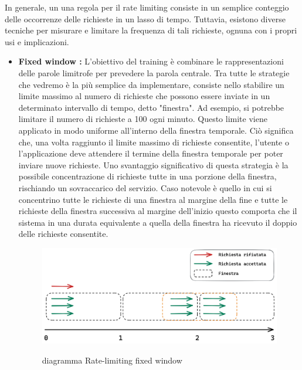In generale, un una regola per il rate limiting consiste in un semplice conteggio delle occorrenze delle richieste in un
lasso di tempo. Tuttavia, esistono diverse tecniche per misurare e limitare la frequenza di tali richieste, ognuna con i
propri usi e implicazioni.
\begin{itemize}
    \item \textbf{Fixed window :} L'obiettivo del training è combinare le rappresentazioni delle parole limitrofe per
     prevedere la parola centrale. Tra tutte le strategie che vedremo è la più semplice da implementare, consiste nello
     stabilire un limite massimo al numero di richieste che possono essere inviate in un determinato intervallo di
     tempo, detto "finestra". Ad esempio, si potrebbe limitare il numero di richieste a 100 ogni minuto. Questo limite
     viene applicato in modo uniforme all'interno della finestra temporale. Ciò significa che, una volta raggiunto il
     limite massimo di richieste consentite, l'utente o l'applicazione deve attendere il termine della finestra
     temporale per poter inviare nuove richieste. Uno svantaggio significativo di questa strategia è la possibile
     concentrazione di richieste tutte in una porzione della finestra, rischiando un sovraccarico del servizio. Caso
     notevole è quello in cui si concentrino tutte le richieste di una finestra al margine della fine e tutte le
     richieste della finestra successiva al margine dell’inizio questo comporta che il sistema in una durata equivalente
     a quella della finestra ha ricevuto il doppio delle richieste consentite.\clearpage
        \begin{figure}[H]
        \centering
        \includegraphics[width=12cm]{./immagini/mieimmagini/fixed_window.png}
        \label{fixed window diagram}
        \caption{diagramma Rate-limiting fixed window }
        \end{figure}
    

\end{itemize}
